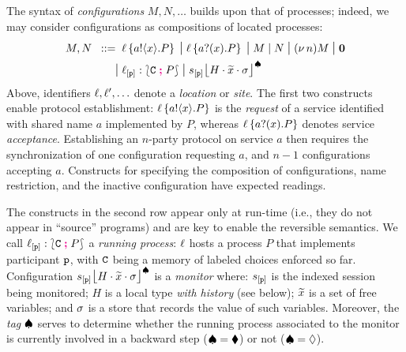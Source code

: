 \documentclass[runningheads,plain]{llncs}
\begin{document}
The syntax of \emph{configurations} $M, N, \ldots$ builds upon that of processes; indeed, we may consider configurations as compositions of located processes:
\begin{align*}
M,N		 \bnfis &
\myloc{\loc}{\bout{a}{x}{P}}
\sbnfbar 
\myloc{\loc}{\binp{a}{x}{P}}
\sbnfbar 
M \Par N 
\sbnfbar 
\news{n} M
\sbnfbar 
\inact 
\\
 \sbnfbar &
{\np{\ep{\loc}{\p}}{\conf{\stack C}{P}}} %
\sbnfbar 
{\monig{\ep{s}{\p}}{H}{\mytilde{x}}{\store}}  %
\end{align*}
Above,  identifiers $\ell, \ell', \ldots$ denote a  \emph{location} or  \emph{site}. 
The first two constructs enable protocol establishment:
$\ell\left\{a ! \langle x \rangle .{P}\right\}$ is the \emph{request} of a service identified with shared name $a$ implemented by
$P$, whereas $\ell\left\{a ? (x) .{P}\right\}$ denotes service \emph{acceptance}. 
Establishing an $n$-party protocol on service $a$ then requires the synchronization of one configuration requesting $a$, and $n-1$ configurations accepting $a$.
Constructs for specifying the composition of configurations, name restriction, and the inactive configuration have expected readings.

The constructs in the second row appear only at run-time (i.e., they do not appear in ``source'' programs) and are key to enable the reversible semantics. We call $\ell_{[\mathtt{p}]}:\lbag \mathtt{C} \; \textcolor{magenta}{\textbf{;}}\; P \rbag$ a \emph{running process}:  $\ell$ hosts a process $P$ that implements participant $\mathtt{p}$, with $\mathtt{C}$ being a memory of  labeled choices enforced so far. Configuration ${s_{[\mathtt{p}]}\mbox{{\large $\lfloor$}} \textcolor{black}{H}\cdot \widetilde{x}\cdot \sigma \mbox{{\large $\rfloor$}}^{\spadesuit}}$ is a \emph{monitor}
where: 
$s_{[\mathtt{p}]}$ is the indexed session being monitored;
$H$ is a  local type \emph{with history} (see below);
$\widetilde{x}$ is a set of free variables;
and  $\sigma$ is a store that records the value of such variables.
Moreover, the \emph{tag} $\spadesuit$ serves to determine whether 
the running process associated to the monitor is currently involved in a backward step ($\spadesuit = \blacklozenge$) or not ($\spadesuit = \lozenge$).
\end{document}
